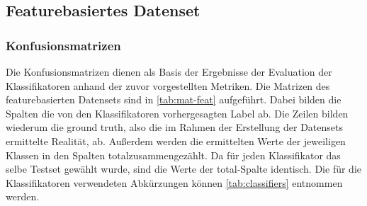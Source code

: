 \subsection{Featurebasiertes Datenset}
\subsubsection*{Konfusionsmatrizen}

Die Konfusionsmatrizen dienen als Basis der Ergebnisse der Evaluation der Klassifikatoren anhand der zuvor vorgestellten Metriken. Die Matrizen des featurebasierten Datensets sind in \autoref{tab:mat-feat} aufgeführt. Dabei bilden die Spalten die von den Klassifikatoren vorhergesagten Label ab. Die Zeilen bilden wiederum die \glqq ground truth\grqq{}, also die im Rahmen der Erstellung der Datensets ermittelte Realität, ab. Außerdem werden die ermittelten Werte der jeweiligen Klassen in den Spalten \glqq total\grqq zusammengezählt. Da für jeden Klassifikator das selbe Testset gewählt wurde, sind die Werte der \glqq total\grqq-Spalte identisch. Die für die Klassifikatoren verwendeten Abkürzungen können \autoref{tab:classifiers} entnommen werden.

